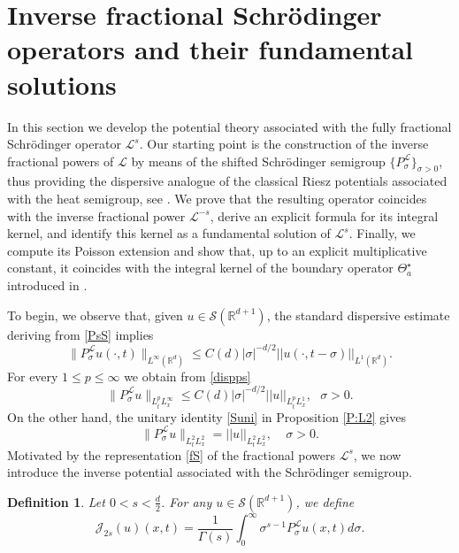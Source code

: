 \documentclass[11pt,letter]{amsart}
\def \R {\mathbb{R}}
\def \G{\Gamma}
\newcommand{\Rd}{\mathbb R^d}
\numberwithin{equation}{section}
\newcommand{\Le}{\mathcal L}
\newcommand{\ps}{P_\sigma^{\Le}}
\newtheorem{definition}[theorem]{Definition}
\numberwithin{equation}{section}
\begin{document}
\section{Inverse fractional Schr\"odinger operators and their fundamental solutions}\label{S:inverse}


In this section we develop the potential theory associated with the fully
fractional Schr\"odinger operator $\Le^s$.
Our starting point is the construction of the inverse fractional powers of
$\mathcal L$ by means of the shifted Schr\"odinger semigroup
$\{P_\sigma^{\mathcal L}\}_{\sigma>0}$,
thus providing the dispersive analogue of the classical Riesz potentials
associated with the heat semigroup, see \cite{R, Samp, St, Sa, NyS, ST}.
We prove that the resulting operator coincides with the inverse fractional
power $\mathcal L^{-s}$, derive an explicit formula for its integral kernel,
and identify this kernel as a fundamental solution of $\mathcal L^s$.
Finally, we compute its Poisson extension and show that, up to an explicit
multiplicative constant, it coincides with the integral kernel of the
boundary operator $\Theta_a^\star$ introduced in \cite{GS2}.


To begin, we observe that, given $u\in \mathscr S(\R^{d+1})$, the standard dispersive estimate deriving from \eqref{PsS} implies
\begin{equation}\label{dispps}
\|\ps u(\cdot,t)\|_{L^\infty(\Rd)}\le C(d) |\sigma|^{-d/2} ||u(\cdot,t-\sigma)||_{L^1(\Rd)}.
\end{equation}
For every $1\le p\le \infty$ we obtain from \eqref{dispps}
\begin{equation}\label{pp}
\|\ps u\|_{L^p_t L^\infty_x}\le C(d) |\sigma|^{-d/2} ||u||_{L^p_t L^1_x},\ \ \ \sigma>0.
\end{equation}
On the other hand, the unitary identity \eqref{Suni} in Proposition \ref{P:L2} gives
\begin{equation}\label{twotwo}
\|\ps u\|_{L^2_t L^2_x} = ||u||_{L^2_t L^2_x},\ \ \ \ \ \sigma>0.
\end{equation}
Motivated by the representation \eqref{fS} of the fractional powers $\Le^s$, we now
introduce the inverse potential associated with the Schr\"odinger semigroup.

\begin{definition}\label{D:Spot}
Let $0<s<\frac d2$. For any $u\in \mathscr S(\R^{d+1})$, we define
\[
\mathscr J_{2s}(u)(x,t) = \frac{1}{\G(s)} \int_0^\infty \sigma^{s -1} \ps u(x,t) d\sigma.
\]
\end{definition}
 
\end{document}
